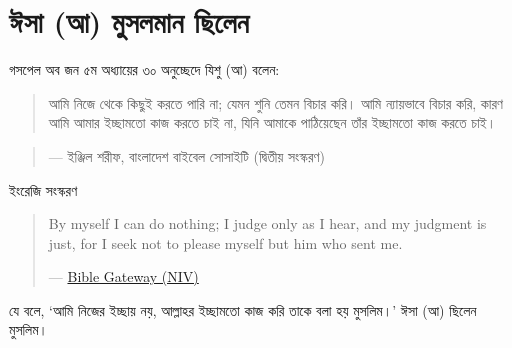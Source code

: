 \documentclass[
]{book}
\begin{document}
\hypertarget{ux988ux9b8ux9be-ux986-ux9aeux9c1ux9b8ux9b2ux9aeux9beux9a8-ux99bux9bfux9b2ux9c7ux9a8}{%
\section*{ঈসা (আ) মুসলমান ছিলেন}\label{ux988ux9b8ux9be-ux986-ux9aeux9c1ux9b8ux9b2ux9aeux9beux9a8-ux99bux9bfux9b2ux9c7ux9a8}}

গসপেল অব জন ৫ম অধ্যায়ের ৩০ অনুচ্ছেদে যিশু (আ) বলেন:

\begin{quote}
আমি নিজে থেকে কিছুই করতে পারি না; যেমন শুনি তেমন বিচার করি। আমি ন্যায়ভাবে বিচার করি, কারণ আমি আমার ইচ্ছামতো কাজ করতে চাই না, যিনি আমাকে পাঠিয়েছেন তাঁর ইচ্ছামতো কাজ করতে চাই।
\end{quote}

\begin{quote}
\end{quote}

\begin{quote}
--- ইঞ্জিল শরীফ, বাংলাদেশ বাইবেল সোসাইটি (দ্বিতীয় সংস্করণ)
\end{quote}

ইংরেজি সংস্করণ

\begin{quote}
By myself I can do nothing; I judge only as I hear, and my judgment is just, for I seek not to please myself but him who sent me.

--- \href{https://www.biblegateway.com/passage/?search=John+5\&version=NIV}{Bible Gateway (NIV)}
\end{quote}

যে বলে, `আমি নিজের ইচ্ছায় নয়, আল্লাহর ইচ্ছামতো কাজ করি তাকে বলা হয় মুসলিম।' ঈসা (আ) ছিলেন মুসলিম।
\end{document}
